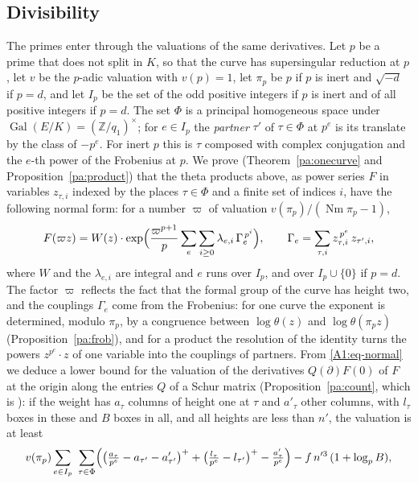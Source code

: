 \documentclass[10pt]{amsart}
\theoremstyle{definition}
\theoremstyle{remark}
\newcommand{\Z}{\mathbb Z}
\providecommand{\auNm}{\operatorname{Nm}}
\providecommand{\auPl}{\Phi}
\begin{document}
\subsection*{Divisibility}
The primes enter through the valuations of the same derivatives. Let $p$ be a prime that
does not split in $K$, so that the curve has supersingular reduction at $p$, let $v$ be the
$p$-adic valuation with $v(p)=1$, let $\pi_p$ be $p$ if $p$ is inert and $\sqrt{-d}$ if $p=d$,
and let $I_p$ be the set of the odd positive integers if $p$ is inert and of all positive integers
if $p=d$. The set $\auPl$ is a principal homogeneous space under $\operatorname{Gal}(E/K)=
(\Z/q_1)^\times$; for $e\in I_p$ the \emph{partner} $\tau'$ of $\tau\in\auPl$ at $p^e$ is its
translate by the class of $-p^e$. For inert $p$ this is $\tau$ composed with complex conjugation
and the $e$-th power of the Frobenius at $p$. We prove (Theorem~\ref{pa:onecurve} and
Proposition~\ref{pa:product}) that the theta products above, as power series $F$ in variables
$z_{\tau,i}$ indexed by the places $\tau\in\auPl$ and a finite set of indices $i$, have the
following normal form: for a number $\varpi$ of valuation $v(\pi_p)/(\auNm\pi_p-1)$,
\begin{equation}\label{A1:eq-normal}
F(\varpi z)=W(z)\cdot\exp\Bigl(\frac{\varpi^{p+1}}p\sum_{e}\sum_{i\ge0}\lambda_{e,i}\,
\Gamma_e^{\,p^i}\Bigr),\qquad\Gamma_e=\sum_{\tau,i}z_{\tau,i}^{\,p^e}\,z_{\tau',i},
\end{equation}
where $W$ and the $\lambda_{e,i}$ are integral and $e$ runs over $I_p$, and over $I_p\cup\{0\}$ if
$p=d$.
The factor $\varpi$ reflects the fact that the formal group of the curve has height two, and the
couplings $\Gamma_e$ come from the Frobenius: for one curve the exponent is determined, modulo
$\pi_p$, by a congruence between $\log\theta(z)$ and $\log\theta(\pi_pz)$
(Proposition~\ref{pa:frob}), and for a product the resolution of the identity turns the powers
$z^{p^e}\cdot z$ of one variable into the couplings of partners. From \eqref{A1:eq-normal} we
deduce a lower bound for the valuation of the derivatives $Q(\partial)F(0)$ of $F$ at the origin
along the entries $Q$ of a Schur matrix (Proposition~\ref{pa:count}, which is {\cite[Proposition~14.10]{P46}}): if the weight has
$a_\tau$ columns of height one at $\tau$ and $a'_\tau$ other columns, with $l_\tau$ boxes in these
and $B$ boxes in all, and all heights are less than $n'$, the valuation is at least
\[
v(\pi_p)\sum_{e\in I_p}\ \sum_{\tau\in\auPl}\Bigl(\bigl(\tfrac{a_\tau}{p^e}-a_{\tau'}-a'_{\tau'}\bigr)^+
+\bigl(\tfrac{l_\tau}{p^e}-l_{\tau'}\bigr)^+-\tfrac{a'_\tau}{p^e}\Bigr)-f\,n'^3\,(1+\log_pB),
\]
\end{document}
